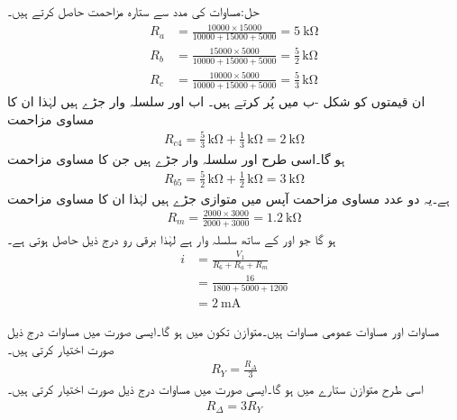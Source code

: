 حل:مساوات  کی مدد سے ستارہ مزاحمت حاصل کرتے ہیں۔
\begin{align*}
R_a&=\frac{10000 \times 15000 }{10000+15000+5000}=\SI{5}{\kilo\ohm}\\
R_b&=\frac{15000\times 5000}{10000+15000+5000}=\frac{5}{2} \, \si{\kilo\ohm}\\
R_c&=\frac{10000\times 5000}{10000+15000+5000}=\frac{5}{3} \, \si{\kilo\ohm}
\end{align*}
ان قیمتوں کو شکل -ب میں پُر کرتے ہیں۔ اب  اور  سلسلہ وار جڑے ہیں لہٰذا ان کا مساوی مزاحمت
\begin{align*}
R_{c4}=\frac{5}{3} \, \si{\kilo\ohm}+\frac{1}{3}\, \si{\kilo\ohm}=\SI{2}{\kilo\ohm}
\end{align*}
ہو گا۔اسی طرح  اور  سلسلہ وار جڑے ہیں جن کا مساوی مزاحمت 
\begin{align*}
R_{b5}=\frac{5}{2} \, \si{\kilo\ohm}+\frac{1}{2} \, \si{\kilo\ohm}=\SI{3}{\kilo\ohm}
\end{align*}
ہے۔یہ دو عدد مساوی مزاحمت آپس میں متوازی جڑے ہیں لہٰذا ان کا مساوی مزاحمت
\begin{align*}
R_m=\frac{2000 \times 3000}{2000+3000}=\SI{1.2}{\kilo\ohm}
\end{align*}
ہو گا جو  اور  کے ساتھ سلسلہ وار ہے لہٰذا برقی رو درج ذیل حاصل ہوتی ہے۔
\begin{align*}
i&=\frac{V_1}{R_6+R_a+R_m}\\
&=\frac{16}{1800+5000+1200}\\
&=\SI{2}{\milli\ampere}
\end{align*}


مساوات  اور مساوات  عمومی مساوات ہیں۔متوازن تکون  میں  ہو گا۔ایسی صورت میں مساوات  درج ذیل صورت اختیار کرتی ہیں۔
\begin{align}\label{مساوات_مزاحمتی_متوازن_تکون_سے_ستارہ}
R_Y=\frac{R_{\Delta}}{3}
\end{align}
اسی طرح متوازن ستارے میں  ہو گا۔ایسی صورت میں مساوات  درج ذیل صورت اختیار کرتی ہیں۔
\begin{align}\label{مساوات_مزاحمتی_متوازن_ستارہ_سے_تکون}
R_{\Delta}=3 R_Y
\end{align}

